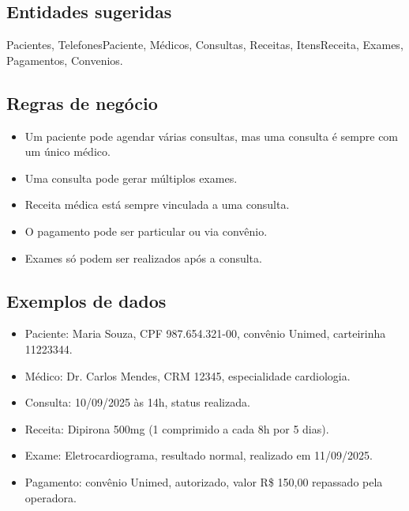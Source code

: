 \documentclass[12pt,a4paper]{article}
\begin{document}
\subsection*{Entidades sugeridas}
Pacientes, TelefonesPaciente, Médicos, Consultas, Receitas, ItensReceita, Exames, Pagamentos, Convenios.

\subsection*{Regras de negócio}
\begin{itemize}
    \item Um paciente pode agendar várias consultas, mas uma consulta é sempre com um único médico.
    \item Uma consulta pode gerar múltiplos exames.
    \item Receita médica está sempre vinculada a uma consulta.
    \item O pagamento pode ser particular ou via convênio.
    \item Exames só podem ser realizados após a consulta.
\end{itemize}

\subsection*{Exemplos de dados}
\begin{itemize}
    \item Paciente: Maria Souza, CPF 987.654.321-00, convênio Unimed, carteirinha 11223344.
    \item Médico: Dr. Carlos Mendes, CRM 12345, especialidade cardiologia.
    \item Consulta: 10/09/2025 às 14h, status realizada.
    \item Receita: Dipirona 500mg (1 comprimido a cada 8h por 5 dias).
    \item Exame: Eletrocardiograma, resultado normal, realizado em 11/09/2025.
    \item Pagamento: convênio Unimed, autorizado, valor R\$ 150,00 repassado pela operadora.
\end{itemize}
\end{document}
